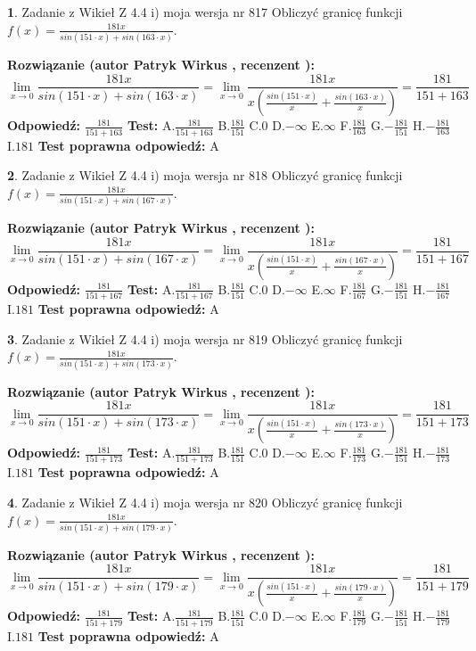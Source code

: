 \documentclass[12pt, a4paper]{article}
\theoremstyle{definition} %
\newtheorem{zad}{}
\newcommand{\zadStart}[1]{\begin{zad}#1\newline}
\newcommand{\zadStop}{\end{zad}}
\newcommand{\rozwStart}[2]{\noindent \textbf{Rozwiązanie (autor #1 , recenzent #2): }\newline}
\newcommand{\rozwStop}{\newline}
\newcommand{\odpStart}{\noindent \textbf{Odpowiedź:}\newline}
\newcommand{\odpStop}{\newline}
\newcommand{\testStart}{\noindent \textbf{Test:}\newline}
\newcommand{\testStop}{\newline}
\newcommand{\kluczStart}{\noindent \textbf{Test poprawna odpowiedź:}\newline}
\newcommand{\kluczStop}{\newline}
\begin{document}
\zadStart{Zadanie z Wikieł Z 4.4 i) moja wersja nr 817}
Obliczyć granicę funkcji $f(x)=\frac{181x}{sin(151\cdot x) +sin(163\cdot x)}$.
\zadStop
\rozwStart{Patryk Wirkus}{}
$$\lim\limits_{x\to 0}\frac{181x}{sin(151\cdot x) +sin(163\cdot x)}=\lim\limits_{x\to 0}\frac{181x}{x(\frac{sin(151\cdot x)}{x}+\frac{sin(163\cdot x)}{x})}=\frac{181}{151+163}$$
\rozwStop
\odpStart
$\frac{181}{151+163}$
\odpStop
\testStart
A.$\frac{181}{151+163}$
B.$\frac{181}{151}$
C.$0$
D.$-\infty$
E.$\infty$
F.$\frac{181}{163}$
G.$-\frac{181}{151}$
H.$-\frac{181}{163}$
I.$181$
\testStop
\kluczStart
A
\kluczStop



\zadStart{Zadanie z Wikieł Z 4.4 i) moja wersja nr 818}
Obliczyć granicę funkcji $f(x)=\frac{181x}{sin(151\cdot x) +sin(167\cdot x)}$.
\zadStop
\rozwStart{Patryk Wirkus}{}
$$\lim\limits_{x\to 0}\frac{181x}{sin(151\cdot x) +sin(167\cdot x)}=\lim\limits_{x\to 0}\frac{181x}{x(\frac{sin(151\cdot x)}{x}+\frac{sin(167\cdot x)}{x})}=\frac{181}{151+167}$$
\rozwStop
\odpStart
$\frac{181}{151+167}$
\odpStop
\testStart
A.$\frac{181}{151+167}$
B.$\frac{181}{151}$
C.$0$
D.$-\infty$
E.$\infty$
F.$\frac{181}{167}$
G.$-\frac{181}{151}$
H.$-\frac{181}{167}$
I.$181$
\testStop
\kluczStart
A
\kluczStop



\zadStart{Zadanie z Wikieł Z 4.4 i) moja wersja nr 819}
Obliczyć granicę funkcji $f(x)=\frac{181x}{sin(151\cdot x) +sin(173\cdot x)}$.
\zadStop
\rozwStart{Patryk Wirkus}{}
$$\lim\limits_{x\to 0}\frac{181x}{sin(151\cdot x) +sin(173\cdot x)}=\lim\limits_{x\to 0}\frac{181x}{x(\frac{sin(151\cdot x)}{x}+\frac{sin(173\cdot x)}{x})}=\frac{181}{151+173}$$
\rozwStop
\odpStart
$\frac{181}{151+173}$
\odpStop
\testStart
A.$\frac{181}{151+173}$
B.$\frac{181}{151}$
C.$0$
D.$-\infty$
E.$\infty$
F.$\frac{181}{173}$
G.$-\frac{181}{151}$
H.$-\frac{181}{173}$
I.$181$
\testStop
\kluczStart
A
\kluczStop



\zadStart{Zadanie z Wikieł Z 4.4 i) moja wersja nr 820}
Obliczyć granicę funkcji $f(x)=\frac{181x}{sin(151\cdot x) +sin(179\cdot x)}$.
\zadStop
\rozwStart{Patryk Wirkus}{}
$$\lim\limits_{x\to 0}\frac{181x}{sin(151\cdot x) +sin(179\cdot x)}=\lim\limits_{x\to 0}\frac{181x}{x(\frac{sin(151\cdot x)}{x}+\frac{sin(179\cdot x)}{x})}=\frac{181}{151+179}$$
\rozwStop
\odpStart
$\frac{181}{151+179}$
\odpStop
\testStart
A.$\frac{181}{151+179}$
B.$\frac{181}{151}$
C.$0$
D.$-\infty$
E.$\infty$
F.$\frac{181}{179}$
G.$-\frac{181}{151}$
H.$-\frac{181}{179}$
I.$181$
\testStop
\kluczStart
A
\kluczStop
\end{document}
